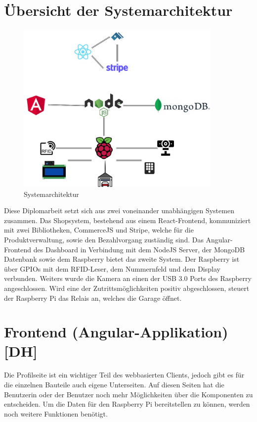 \section{Übersicht der Systemarchitektur}
\begin{figure}[h]
    \centering
    \includegraphics[width=10cm]{pics/APERTASystemarchitektur.jpg}
    \caption{Systemarchitektur}
    \end{figure}
Diese Diplomarbeit setzt sich aus zwei voneinander unabhängigen Systemen zusammen. Das Shopsystem, bestehend aus einem React-Frontend, kommuniziert mit zwei Bibliotheken, CommerceJS und Stripe, welche für die Produktverwaltung, sowie den Bezahlvorgang zuständig sind. Das Angular-Frontend des Dashboard in Verbindung mit dem NodeJS Server, der MongoDB Datenbank sowie dem Raspberry bietet das zweite System.
Der Raspberry ist über GPIOs mit dem RFID-Leser, dem Nummernfeld und dem Display verbunden. Weiters wurde die Kamera an einen der USB 3.0 Ports des Raspberry angeschlossen. Wird eine der Zutrittsmöglichkeiten positiv abgeschlossen, steuert der Raspberry Pi das Relais an, welches die Garage öffnet.
\section{Frontend (Angular-Applikation) [DH]}

Die Profilseite ist ein wichtiger Teil des webbasierten Clients, jedoch gibt es für die einzelnen Bauteile auch eigene Unterseiten. Auf diesen Seiten hat die Benutzerin oder der Benutzer noch mehr Möglichkeiten über die Komponenten zu entscheiden. Um die Daten für den Raspberry Pi bereitstellen zu können, werden noch weitere Funktionen benötigt.

